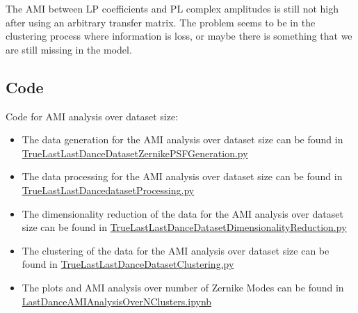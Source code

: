		The AMI between LP coefficients and PL complex amplitudes is still not high after using an arbitrary transfer matrix. The problem seems to be in the clustering process where information is loss, or maybe there is something that we are still missing in the model.\\
		
	
	\subsection{Code}
	
	Code for AMI analysis over dataset size:
	\begin{itemize}
		\item The data generation for the AMI analysis over dataset size can be found in \href{https://github.com/Dacarpe03/PLImageReconstruction/blob/main/PSFReconstruction/Scripts/TrueLastLastDanceDatasetZernikePSFGeneration.py}{TrueLastLastDanceDatasetZernikePSFGeneration.py}
		\item The data processing for the AMI analysis over dataset size can be found in \href{https://github.com/Dacarpe03/PLImageReconstruction/blob/main/PSFReconstruction/Scripts/TrueLastLastDancedatasetProcessing.py}{TrueLastLastDancedatasetProcessing.py}
		\item The dimensionality reduction of the data for the AMI analysis over dataset size can be found in \href{https://github.com/Dacarpe03/PLImageReconstruction/blob/main/PSFReconstruction/Scripts/TrueLastLastDanceDatasetDimensionalityReduction.py}{TrueLastLastDanceDatasetDimensionalityReduction.py}
		\item The clustering of the data for the AMI analysis over dataset size can be found in \href{https://github.com/Dacarpe03/PLImageReconstruction/blob/main/PSFReconstruction/Scripts/TrueLastLastDanceDatasetClustering.py}{TrueLastLastDanceDatasetClustering.py}
		\item The plots and AMI analysis over number of Zernike Modes can be found in \href{https://github.com/Dacarpe03/PLImageReconstruction/blob/main/PSFReconstruction/DataNotebooks/LastDanceAMIAnalysisOverNClusters.ipynb}{LastDanceAMIAnalysisOverNClusters.ipynb}
	\end{itemize}
	